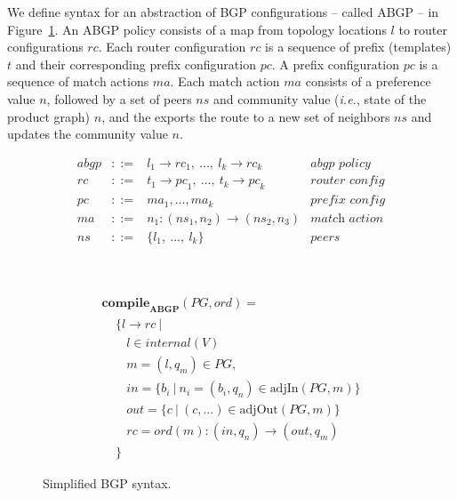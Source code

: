\documentclass[twocolumn]{sig-alternate-10pt}
\newcommand{\IE}{\emph{i.e.}}
\begin{document}
We define syntax for an abstraction of BGP configurations -- called ABGP -- in Figure~\ref{fig:abgp-syntax}. An ABGP policy consists of a map from topology locations $l$ to router configurations $rc$. Each router configuration $rc$ is a sequence of prefix (templates) $t$ and their corresponding prefix configuration $pc$. A prefix configuration $pc$ is a sequence of match actions $ma$. Each match action $ma$ consists of a preference value $n$, followed by a set of peers $ns$ and community value (\IE, state of the product graph) $n$, and the exports the route to a new set of neighbors $ns$ and updates the community value $n$.

\vspace{2em}
\begin{figure}[h!]\small

  \hrulefill%
  \vspace{1em}

  \begin{minipage}[t]{.5\linewidth}
  \vspace*{-1\baselineskip}
  \[ \begin{array}{rclr}
     abgp &::=& l_1 \rightarrow {rc}_1, ~\dots,~ l_k \rightarrow {rc}_k & \textit{abgp policy} \\
     rc   &::=& t_1 \rightarrow {pc}_1, ~\dots,~ t_k \rightarrow {pc}_k & \textit{router config} \\
     pc   &::=& ma_1, \dots, ma_k & \textit{prefix config} \\
     ma   &::=& n_1 : ({ns}_1, n_2) \rightarrow ({ns}_2, n_3) & \textit{match action} \\
     ns   &::=& \{ l_1, ~\dots,~ l_k \} & \textit{peers} \\
  \end{array} \]%

  \end{minipage}
  ~~
  \vrule
  ~~
  \begin{minipage}[t]{.5\linewidth}
  \vspace*{-1\baselineskip}
  \[ \begin{array}{l}
     \textbf{compile}_\textbf{ABGP}(PG,ord) = \\
     ~~~~~ \{ l \rightarrow rc ~\vert \\
     ~~~~~~~~~ l \in internal(V) \\
     ~~~~~~~~~ m = (l,q_m) \in PG, \\
     ~~~~~~~~~ in = \{ b_i ~\vert~ n_i = (b_i,q_n) \in \text{adjIn}(PG,m) \} \\
     ~~~~~~~~~ out = \{ c ~\vert~ (c,\dots) \in \text{adjOut}(PG,m) \} \\
     ~~~~~~~~~ rc = ord(m) : (in,q_n) \rightarrow (out,q_m) \\
     ~~~~~ \}
  \end{array} \]%

  \end{minipage}

  \vspace{1em}
  \hrulefill%
  \vspace{1em}

  \caption{Simplified BGP syntax.}
  \label{fig:abgp-syntax}
\end{figure}%
\end{document}
